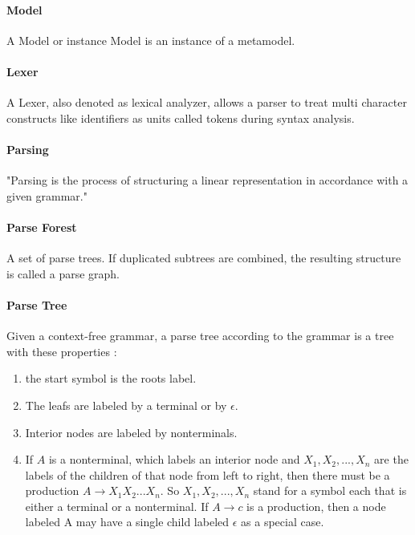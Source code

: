 \paragraph{Model} A Model or instance Model is an instance of a metamodel.


\paragraph{Lexer}
A Lexer, also denoted as lexical analyzer, allows a parser to treat multi character constructs like identifiers as units called tokens during syntax analysis. \cite{DragonBook}




\paragraph{Parsing} 
"Parsing is the process of structuring a linear representation in accordance with a given grammar." \cite{ParserBook}

\paragraph{Parse Forest} 
A set of parse trees. If duplicated subtrees are combined, the resulting structure is called a parse graph. \cite{ParserBook}

\paragraph{Parse Tree}
Given a context-free grammar, a parse tree according to the grammar is a tree with these properties \cite{DragonBook}:
\begin{enumerate}
	\item the start symbol is the roots label.
	\item The leafs are labeled by a terminal or by $\epsilon$.
	\item Interior nodes are labeled by nonterminals.
	\item If $A$ is a nonterminal, which labels an interior node and $X_1, X_2, . . . , X_n$ are the labels of the children of that node from left to right, then there must be a production $A  \rightarrow X_1X_2 ... X_n$. So $X_1, X_2, ... , X_n$ stand for a symbol each that is either a terminal or a nonterminal. If $A\rightarrow c$ is a production, then a node labeled A may have a single child labeled $\epsilon$ as a special case. 
\end{enumerate}
